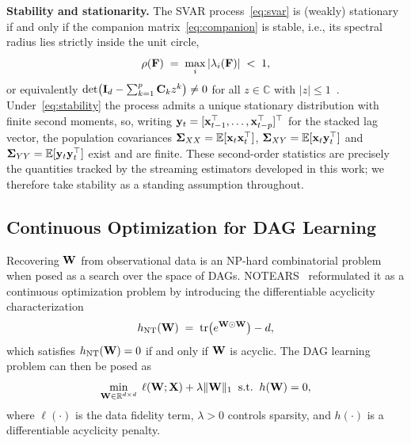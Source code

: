 \documentclass[journal,twoside]{IEEEtran}
\begin{document}
\noindent \textbf{Stability and stationarity.} The SVAR process~\eqref{eq:svar} is
(weakly) stationary if and only if the companion matrix~\eqref{eq:companion} is
stable, i.e., its spectral radius lies strictly inside the unit circle,
\begin{equation}
\label{eq:stability}
\rho({\mathbf F}) \;=\; \max_{i}\,\lvert \lambda_i({\mathbf F}) \rvert \;<\; 1,
\end{equation}
or equivalently $\det\!\big({\mathbf I}_d - \sum_{k=1}^{p}{\mathbf C}_k z^{k}\big) \neq 0$ for
all $z \in \mathbb{C}$ with $\lvert z \rvert \le 1$~\cite[Ch. 2.2]{KilianSVAR}. Under~\eqref{eq:stability}
the process admits a unique stationary distribution with finite second moments,
so, writing ${\mathbf y}_t = [{\mathbf x}_{t-1}^\top, \ldots, {\mathbf x}_{t-p}^\top]^\top$ for the
stacked lag vector, the population covariances $\boldsymbol{\Sigma}_{XX} = \mathbb{E}[{\mathbf x}_t {\mathbf x}_t^\top]$,
$\boldsymbol{\Sigma}_{XY} = \mathbb{E}[{\mathbf x}_t {\mathbf y}_t^\top]$ and $\boldsymbol{\Sigma}_{YY} = \mathbb{E}[{\mathbf y}_t {\mathbf y}_t^\top]$
exist and are finite. These second-order statistics are precisely the
quantities tracked by the streaming estimators developed in this work; we
therefore take stability as a standing assumption throughout.

\subsection{Continuous Optimization for DAG Learning}
\label{sec:continuous-dag}
Recovering ${\mathbf W}$ from observational data is an NP-hard combinatorial
problem~\cite{chickering1996learning} when posed as a search over the
space of DAGs. NOTEARS~\cite{zheng2018dags} reformulated it as a continuous
optimization problem by introducing the differentiable acyclicity
characterization
\begin{equation}
\label{eq:notears-h}
h_{\mathrm{NT}}({\mathbf W}) \;=\; \mathrm{tr}\!\left(e^{{\mathbf W} \odot {\ensuremath{\mathbf W}}}
\right) - d,
\end{equation}
which satisfies $h_{\mathrm{NT}}({\mathbf W}) = 0$ if and only if ${\mathbf W}$ is
acyclic. The DAG learning problem can then be posed as
\begin{equation}
\label{eq:dag-prob}
\min_{{\mathbf W} \in \mathbb{R}^{d \times d}}
\; \ell({\mathbf W}; {\mathbf X}) + \lambda \|{\mathbf W}\|_1
\;\; \mathrm{s.t.} \;\; h({\mathbf W}) = 0,
\end{equation}
where $\ell(\cdot)$ is the data fidelity term, $\lambda > 0$ controls
sparsity, and $h(\cdot)$ is a differentiable acyclicity penalty.
\end{document}
